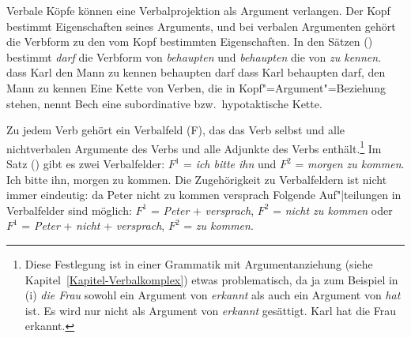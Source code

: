 
Verbale Köpfe können eine Verbalprojektion als Argument verlangen. Der Kopf bestimmt
Eigenschaften seines Arguments, und bei verbalen Argumenten gehört die Verbform zu 
den vom Kopf bestimmten Eigenschaften. In den Sätzen () bestimmt \emph{darf}
die Verbform von \emph{behaupten} und \emph{behaupten} die von \emph{zu kennen}.
\eal
\ex dass Karl den Mann zu kennen behaupten darf
\ex dass Karl behaupten darf, den Mann zu kennen
\zl
Eine Kette von Verben, die in Kopf"=Argument"=Beziehung stehen, nennt Bech eine subordinative
bzw.\ hypotaktische Kette.%
%
%
%
%


%
%
Zu jedem Verb gehört ein Verbalfeld (F), das das Verb selbst und alle nichtverbalen
Argumente des Verbs und alle Adjunkte des Verbs enthält.\footnote{
        Diese Festlegung ist in einer Grammatik mit Argumentanziehung
        (siehe Kapitel~\ref{Kapitel-Verbalkomplex}) etwas
        problematisch, da ja zum Beispiel in (i) \emph{die Frau} sowohl ein
        Argument von \emph{erkannt} als auch ein Argument von \emph{hat} ist.
        Es wird nur nicht als Argument von \emph{erkannt} gesättigt.
\ea
Karl hat die Frau erkannt.
\zlast%
}
Im Satz () gibt es zwei Verbalfelder: $F^1$ = \emph{ich bitte ihn} und $F^2$ =
\emph{morgen zu kommen}.
\ea
Ich bitte ihn, morgen zu kommen.
\z
Die Zugehörigkeit zu Verbalfeldern ist nicht immer eindeutig:
\ea
\label{zu_kommen_versprach}
da Peter nicht zu kommen versprach
\z
Folgende Auf"|teilungen in Verbalfelder sind möglich: $F^1$ = \emph{Peter} + \emph{versprach},
$F^2$ = \emph{nicht zu kommen} oder $F^1$ = \emph{Peter} + \emph{nicht} + \emph{versprach}, 
$F^2$ = \emph{zu kommen}.

